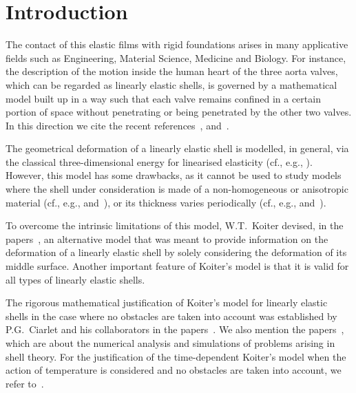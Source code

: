 \documentclass{amsart}
\begin{document}
	\maketitle
	
\section{Introduction}
\label{Sec:0}

The contact of this elastic films with rigid foundations arises in many applicative fields such as Engineering, Material Science, Medicine and Biology. For instance, the description of the motion inside the human heart of the three aorta valves, which can be regarded as linearly elastic shells, is governed by a mathematical model built up in a way such that each valve remains confined in a certain portion of space without penetrating or being penetrated by the other two valves. In this direction we cite the recent references~\cite{Quarteroni2021-3}, \cite{Quarteroni2021-2} and~\cite{Quarteroni2021-1}.

The geometrical deformation of a linearly elastic shell is modelled, in general, via the classical three-dimensional energy for linearised elasticity (cf., e.g., \cite{Ciarlet1988}). However, this model has some drawbacks, as it cannot be used to study models where the shell under consideration is made of a non-homogeneous or anisotropic material (cf., e.g., \cite{CaillerieSanchez1995a} and~\cite{CaillerieSanchez1995b}), or its thickness varies periodically (cf., e.g., \cite{TelegaLewinski1998a} and~\cite{TelegaLewinski1998b}).

To overcome the intrinsic limitations of this model, W.T.~Koiter devised, in the papers~\cite{Koiter,Koiter1970}, an alternative model that was meant to provide information on the deformation of a linearly elastic shell by solely considering the deformation of its middle surface. Another important feature of Koiter's model is that it is valid for all types of linearly elastic shells.

The rigorous mathematical justification of Koiter's model for linearly elastic shells in the case where no obstacles are taken into account was established by P.G.~Ciarlet and his collaborators in the papers~\cite{CiaDes1979, CiaLods1996a,CiaLods1996b,CiaLods1996c,CiaLods1996d,CiaLodsMia1996}. We also mention the papers~\cite{MeiPie2024,PPS2024,PPS2024-2,PS,Shen2018,Shen2019,Shen2020}, which are about the numerical analysis and simulations of problems arising in shell theory. For the justification of the time-dependent Koiter's model when the action of temperature is considered and no obstacles are taken into account, we refer to~\cite{Pie-2021}. 
\end{document}
